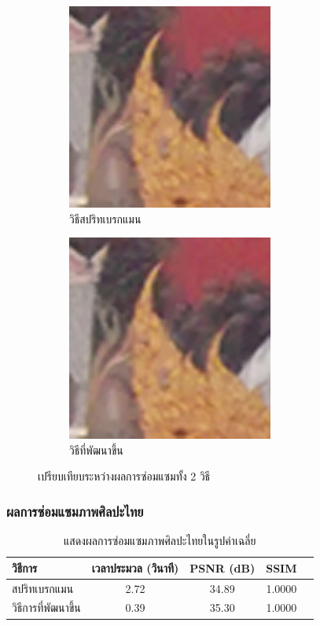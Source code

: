 \documentclass[xcolor=dvipsnames, xetex,serif]{beamer}
\numberwithin{equation}{section}
\begin{document}
\begin{frame}
\begin{figure}[H]
\begin{subfigure}{0.4\linewidth}
					\includegraphics[width=0.6\linewidth]{images/result_ex4_scaleup/splitbregman.png}			
					\caption{วิธีสปริทเบรกแมน}
				\end{subfigure}
				\begin{subfigure}{0.4\linewidth}
					\centering
					\includegraphics[width=0.6\linewidth]{images/result_ex4_scaleup/multisplitbregman.png}	
					\caption{วิธีที่พัฒนาขึ้น}
				\end{subfigure}
				\caption{เปรียบเทียบระหว่างผลการซ่อมแซมทั้ง 2 วิธี}
			\end{figure}
		\end{frame}
		\begin{frame}
			\frametitle{ผลการซ่อมแซมภาพศิลปะไทย}
			\begin{table}[H]
				\centering
				\begin{tabular}[ht]{|l|c|c|c|c|}
					\hline
					วิธีการ  & เวลาประมวล  (วินาที) & PSNR (dB) & SSIM \\
					\hline
					สปริทเบรกแมน & 2.72 & 34.89 & 1.0000 \\ 
					วิธีการที่พัฒนาขึ้น & 0.39 & 35.30 & 1.0000 \\
					\hline
				\end{tabular}
				\caption{แสดงผลการซ่อมแซมภาพศิลปะไทยในรูปค่าเฉลี่ย}
				\label{result:table-thaiart-summary}
			\end{table}	
		\end{frame}
\end{document}

